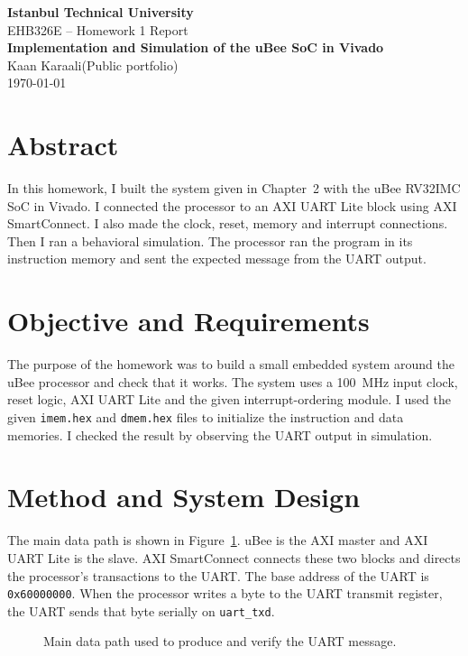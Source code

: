\documentclass[12pt,a4paper]{article}
\newcommand{\ogrenciad}{Kaan Karaali}
\newcommand{\ogrencino}{Public portfolio}
\newcommand{\raporbasligi}{Implementation and Simulation of the uBee SoC in Vivado}
\begin{document}
\begin{center}
{\Large\bfseries Istanbul Technical University}\\[3pt]
{\large EHB326E -- Homework 1 Report}\\[10pt]
{\LARGE\bfseries\color{baslik}\raporbasligi}\\[8pt]
\ogrenciad\quad(\ogrencino)\\[3pt]
\today
\end{center}
\vspace{.3em}
\section{Abstract}
In this homework, I built the system given in Chapter~2 with the uBee RV32IMC
SoC in Vivado. I connected the processor to an AXI UART Lite block using AXI
SmartConnect. I also made the clock, reset, memory and interrupt connections.
Then I ran a behavioral simulation. The processor ran the program in its
instruction memory and sent the expected message from the UART output.

\section{Objective and Requirements}
The purpose of the homework was to build a small embedded system around the
uBee processor and check that it works. The system uses a 100~MHz input clock,
reset logic, AXI UART Lite and the given interrupt-ordering module. I used the
given \texttt{imem.hex} and \texttt{dmem.hex} files to initialize the
instruction and data memories. I checked the result by observing the UART
output in simulation.

\section{Method and System Design}
The main data path is shown in Figure~\ref{fig:system}. uBee is the AXI master
and AXI UART Lite is the slave. AXI SmartConnect connects these two blocks and
directs the processor's transactions to the UART. The base address of the UART
is \texttt{0x60000000}. When the processor writes a byte to the UART transmit
register, the UART sends that byte serially on \texttt{uart\_txd}.

\begin{figure}[htbp]\centering
{}
\caption{Main data path used to produce and verify the UART message.}
\label{fig:system}
\end{figure}
\end{document}
